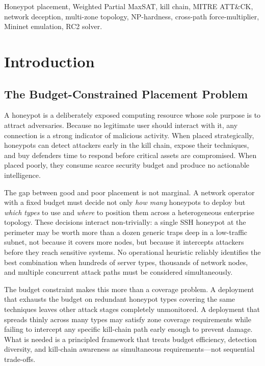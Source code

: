 \documentclass[journal]{IEEEtran}
\begin{document}
\begin{IEEEkeywords}
Honeypot placement, Weighted Partial MaxSAT, kill chain, MITRE
ATT\&CK, network deception, multi-zone topology, NP-hardness,
cross-path force-multiplier, Mininet emulation, RC2 solver.
\end{IEEEkeywords}

\section{Introduction}
\label{sec:intro}

\subsection{The Budget-Constrained Placement Problem}
\label{sec:intro:budget}

A honeypot is a deliberately exposed computing resource whose sole
purpose is to attract adversaries. Because no legitimate user should
interact with it, any connection is a strong indicator of malicious
activity. When placed strategically, honeypots can detect attackers
early in the kill chain, expose their techniques, and buy defenders
time to respond before critical assets are compromised. When placed
poorly, they consume scarce security budget and produce no actionable
intelligence.

The gap between good and poor placement is not marginal. A network
operator with a fixed budget must decide not only \emph{how many}
honeypots to deploy but \emph{which types} to use and \emph{where}
to position them across a heterogeneous enterprise topology. These
decisions interact non-trivially: a single SSH honeypot at the
perimeter may be worth more than a dozen generic traps deep in a
low-traffic subnet, not because it covers more nodes, but because
it intercepts attackers before they reach sensitive systems. No
operational heuristic reliably identifies the best combination when
hundreds of server types, thousands of network nodes, and multiple
concurrent attack paths must be considered simultaneously.

The budget constraint makes this more than a coverage problem. A
deployment that exhausts the budget on redundant honeypot types
covering the same techniques leaves other attack stages completely
unmonitored. A deployment that spreads thinly across many types may
satisfy zone coverage requirements while failing to intercept any
specific kill-chain path early enough to prevent damage. What is
needed is a principled framework that treats budget efficiency,
detection diversity, and kill-chain awareness as simultaneous
requirements---not sequential trade-offs.
\end{document}

